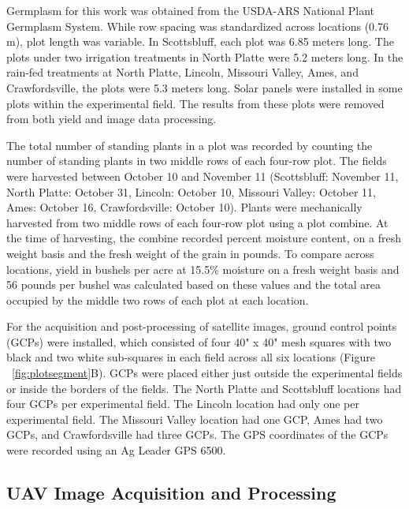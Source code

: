\documentclass[12pt,twoside]{gsag3jnl}
\begin{document}
Germplasm for this work was obtained from the USDA-ARS National Plant Germplasm System. While row spacing was standardized across locations (0.76 m), plot length was variable. In Scottsbluff, each plot was 6.85 meters long. The plots under two irrigation treatments in North Platte were 5.2 meters long. In the rain-fed treatments at North Platte, Lincoln, Missouri Valley, Ames, and Crawfordsville, the plots were 5.3 meters long. Solar panels were installed in some plots within the experimental field. The results from these plots were removed from both yield and image data processing.

The total number of standing plants in a plot was recorded by counting the number of standing plants in two middle rows of each four-row plot. The fields were harvested between October 10 and November 11 (Scottsbluff: November 11, North Platte: October 31, Lincoln: October 10, Missouri Valley: October 11, Ames: October 16, Crawfordsville: October 10).
Plants were mechanically harvested from two middle rows of each four-row plot using a plot combine. At the time of harvesting, the combine recorded percent moisture content, on a fresh weight basis and the fresh weight of the grain in pounds. To compare across locations, yield in bushels per acre at 15.5\% moisture on a fresh weight basis and 56 pounds per bushel was calculated based on these values and the total area occupied by the middle two rows of each plot at each location. 

For the acquisition and post-processing of satellite images, ground control points (GCPs) were installed, which consisted of four 40" x 40" mesh squares with two black and two white sub-squares in each field across all six locations (Figure ~\ref{fig:plotsegment}B). GCPs were placed either just outside the experimental fields or inside the borders of the fields. The North Platte and Scottsbluff locations had four GCPs per experimental field. The Lincoln location had only one per experimental field. The Missouri Valley location had one GCP, Ames had two GCPs, and Crawfordsville had three GCPs. The GPS coordinates of the GCPs were recorded using an Ag Leader GPS 6500.

\subsection{UAV Image Acquisition and Processing}
\end{document}
